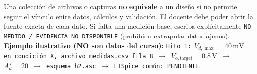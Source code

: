 \documentclass[10pt, a4paper]{article}
\begin{document}
\vspace{-0.2cm}
\begin{tcolorbox}[colback=neutralbg, colframe=ucbblue, boxsep=2pt, top=3pt, bottom=3pt, title=\textbf{Regla de Trazabilidad e Inspección Rápida}]
    \footnotesize\raggedright
    Una colección de archivos o capturas \textbf{no equivale} a un diseño si no permite seguir el vínculo entre datos, cálculos y validación. El docente debe poder abrir la fuente exacta de cada dato. Si falta una medición base, escriba explícitamente \texttt{NO MEDIDO / EVIDENCIA NO DISPONIBLE} (prohibido extrapolar datos ajenos). \\
    \textbf{Ejemplo ilustrativo (NO son datos del curso):} \texttt{Hito 1: $V_{d,\max}=40\,\text{mV}$ en condición X, archivo medidas.csv fila 8 $\rightarrow$ $V_{o,\text{target}}=0.8\,\text{V}$ $\rightarrow$ $A_d^\star=20$ $\rightarrow$ esquema h2.asc $\rightarrow$ LTSpice común: PENDIENTE}.
\end{tcolorbox}
\end{document}
